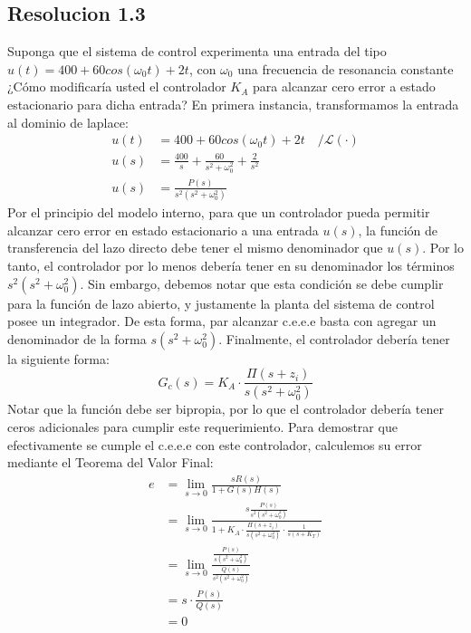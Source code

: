 \documentclass[
  11pt,
  letterpaper,
   addpoints,
   answers
  ]{exam}
\begin{document}
\begin{questions}
\begin{solution}
\subsection*{Resolucion 1.3}
Suponga que el sistema de control experimenta una entrada del tipo $u(t)=400 + 60cos(\omega_0 t) + 2t$, con $\omega_0$ una frecuencia de resonancia constante ¿Cómo modificaría usted el controlador $K_A$ para alcanzar cero error a estado estacionario para dicha entrada?
En primera instancia, transformamos la entrada al dominio de laplace:
\begin{align}
    u(t)&=400+60 cos(\omega_0 t) + 2t \quad / \mathcal{L}(\cdot) \nonumber\\
    u(s)&=\frac{400}{s}+\frac{60}{s^2+\omega_0^2}+\frac{2}{s^2} \nonumber \\
    u(s)&=\frac{P(s)}{s^2(s^2+\omega_0^2)} \nonumber
\end{align}
Por el principio del modelo interno, para que un controlador pueda permitir alcanzar cero error en estado estacionario a una entrada $u(s)$, la función de transferencia del lazo directo debe tener el mismo denominador que $u(s)$. Por lo tanto, el controlador por lo menos debería tener en su denominador los términos $s^2(s^2+\omega_0^2)$. Sin embargo, debemos notar que esta condición se debe cumplir para la función de lazo abierto, y justamente la planta del sistema de control posee un integrador. De esta forma, par alcanzar c.e.e.e basta con agregar un denominador de la forma $s(s^2+\omega_0^2)$. Finalmente, el controlador debería tener la siguiente forma:
\begin{equation}
    G_c(s)=K_A\cdot\frac{\Pi (s+z_i)}{s(s^2+\omega_0^2)} \nonumber
\end{equation}
Notar que la función debe ser bipropia, por lo que el controlador debería tener ceros adicionales para cumplir este requerimiento. Para demostrar que efectivamente se cumple el c.e.e.e con este controlador, calculemos su error mediante el Teorema del Valor Final:
\begin{align}
    e&=\lim_{s\to 0 }\frac{sR(s)}{1+G(s)H(s)} \nonumber \\
    &= \lim_{s\to 0}\frac{s\frac{P(s)}{s^2(s^2+\omega_0^2)}}{1+K_A\cdot\frac{\Pi (s+z_i)}{s(s^2+\omega_0^2)} \cdot \frac{1}{s(s+K_T)}} \nonumber \\
    &=\lim_{s\to 0}\frac{\frac{P(s)}{s(s^2+\omega_0^2)}}{\frac{Q(s)}{s^2(s^2+\omega_0^2)}} \nonumber\\
    &=s\cdot \frac{P(s)}{Q(s)} \nonumber\\
    &=0 \nonumber
\end{align}
\end{solution}
    

\end{questions}
\end{document}
